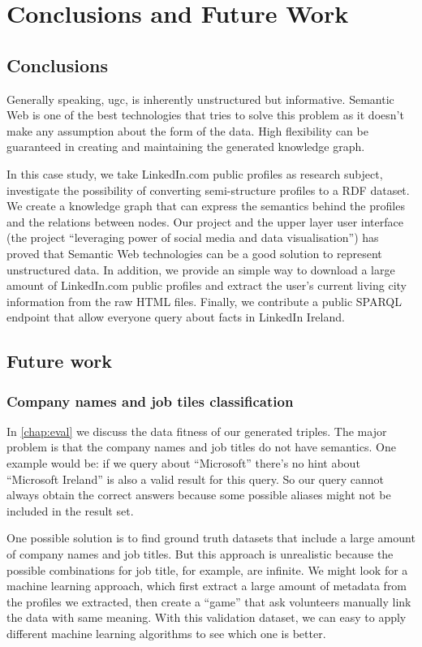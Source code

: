 \chapter{Conclusions and Future Work}

\section{Conclusions}
Generally speaking, \gls{ugc}, is inherently unstructured but informative. Semantic Web is one of the best technologies that tries to solve this problem as it doesn't make any assumption about the form of the data. High flexibility can be guaranteed in creating and maintaining the generated knowledge graph. 

In this case study, we take LinkedIn.com public profiles as research subject, investigate the possibility of converting semi-structure profiles to a RDF dataset. We create a knowledge graph that can express the semantics behind the profiles and the relations between nodes. Our project and the upper layer user interface (the project ``leveraging power of social media and data visualisation'') has proved that Semantic Web technologies can be a good solution to represent unstructured data. In addition, we provide an simple way to download a large amount of LinkedIn.com public profiles and extract the user's current living city information from the raw HTML files. Finally, we contribute a public SPARQL endpoint that allow everyone query about facts in LinkedIn Ireland.

\section{Future work}
\subsection{Company names and job tiles classification}
In \autoref{chap:eval} we discuss the data fitness of our generated triples. The major problem is that the company names and job titles do not have semantics. One example would be: if we query about ``Microsoft'' there's no hint about ``Microsoft Ireland'' is also a valid result for this query. So our query cannot always obtain the correct answers because some possible aliases might not be included in the result set.

One possible solution is to find ground truth datasets that include a large amount of company names and job titles. But this approach is unrealistic because the possible combinations for job title, for example, are infinite. We might look for a machine learning approach, which first extract a large amount of metadata from the profiles we extracted, then create a ``game'' that ask volunteers manually link the data with same meaning. With this validation dataset, we can easy to apply different machine learning algorithms to see which one is better.

